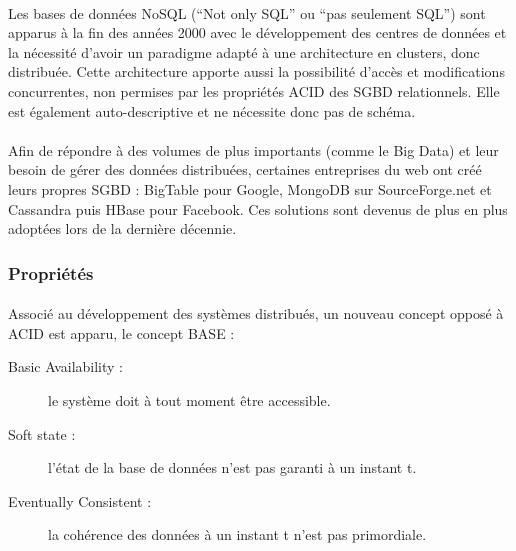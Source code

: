 \paragraph{}Les bases de données NoSQL (“Not only SQL” ou “pas seulement SQL”) sont apparus à la fin des années 2000 avec le développement des centres de données et la nécessité d’avoir un paradigme adapté à une architecture en clusters, donc distribuée. Cette architecture apporte aussi la possibilité d’accès et modifications concurrentes, non permises par les propriétés ACID des SGBD relationnels. Elle est également auto-descriptive et ne nécessite donc pas de schéma.

\paragraph{}Afin de répondre à des volumes de plus importants (comme le Big Data) et leur besoin de gérer des données distribuées, certaines entreprises du web ont créé leurs propres \acrshort{SGBD} : BigTable pour Google, MongoDB sur SourceForge.net et Cassandra puis HBase pour Facebook. Ces solutions sont devenus de plus en plus adoptées lors de la dernière décennie. 

\subsubsection{Propriétés}
\paragraph{}Associé au développement des systèmes distribués, un nouveau concept opposé à ACID est apparu, le concept BASE :
\begin{description}
    \item[Basic Availability :] le système doit à tout moment  être accessible.
    \item[Soft state :] l'état de la base de données n'est pas garanti à un instant t.
    \item[Eventually Consistent :] la cohérence des données à un instant t n'est pas primordiale.
\end{description}

